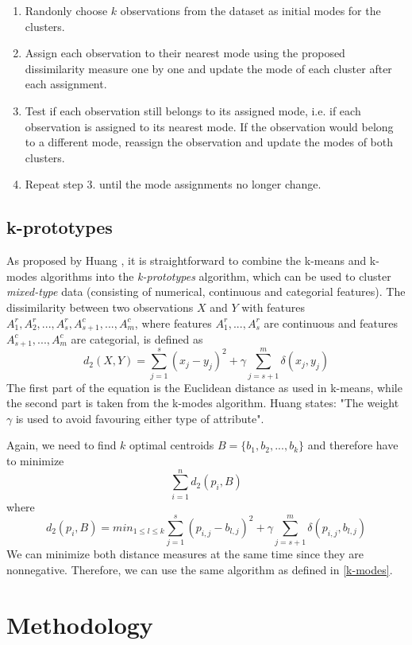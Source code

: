 \begin{enumerate} 
	\item Randonly choose $k$ observations from the dataset as initial modes for the clusters.
	\item Assign each observation to their nearest mode using the proposed dissimilarity measure one by one and update the mode of each cluster after each assignment.
	\item Test if each observation still belongs to its assigned mode, i.e. if each observation is assigned to its nearest mode. If the observation would belong to a different mode, reassign the observation and update the modes of both clusters.
	\item Repeat step 3. until the mode assignments no longer change.
\end{enumerate}

\subsection{k-prototypes}

As proposed by Huang \cite{kmodes}, it is straightforward to combine the k-means and k-modes algorithms into the \textit{k-prototypes} algorithm, which can be used to cluster \textit{mixed-type} data (consisting of numerical, continuous and categorial features). The dissimilarity between two observations $X$ and $Y$ with features $A^r_1, A^r_2, ..., A^r_s, A_{s+1}^c, ..., A^c_m$, where features $A^r_1, ..., A^r_s$ are continuous and features $A_{s+1}^c, ..., A^c_m$ are categorial, is defined as
$$d_2(X,Y) = \sum^s_{j=1}(x_j - y_j)^2 + \gamma \sum^m_{j=s+1}\delta(x_j, y_j)$$
The first part of the equation is the Euclidean distance as used in k-means, while the second part is taken from the k-modes algorithm. Huang \cite{kmodes} states: "The weight $\gamma$ is used to avoid favouring either type of attribute".

Again, we need to find $k$ optimal centroids $B=\{b_1, b_2, ..., b_k\}$ and therefore have to minimize
$$\sum_{i=1}^n  d_2(p_i, B)$$
where
$$d_2(p_i, B) = min_{1 \leq l \leq k} \sum^s_{j=1}(p_{i,j} - b_{l,j})^2 + \gamma \sum^m_{j=s+1}\delta(p_{i,j}, b_{l,j})$$
We can minimize both distance measures at the same time since they are nonnegative. Therefore, we can use the same algorithm as defined in \ref{k-modes}. \cite{kmodes}

\section{Methodology}

